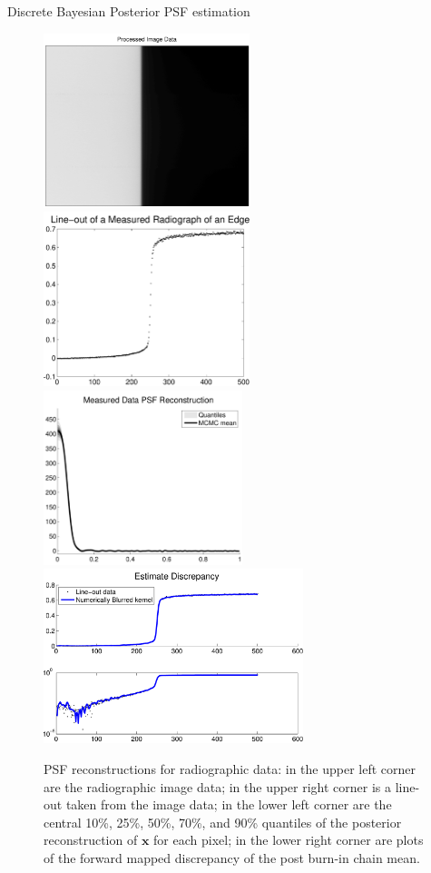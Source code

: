 \begin{chapter}{Discrete Bayesian Posterior PSF estimation}
\begin{figure}[h]
  \begin{center}
  \includegraphics[height=2in]{figures/cygnusImage.pdf}\hspace{2em}\includegraphics[height=2in]{figures/cygnusLineout.pdf}\\\vspace{2em}
  \includegraphics[height=2in]{figures/cygnusPSFrecon.pdf}\hspace{2em}\includegraphics[height=2in]{figures/discrepencyPSF.pdf}
  \caption{
  PSF reconstructions for radiographic data: in the upper left corner are the radiographic image data;
  in the upper right corner is a line-out taken from the image data;
  in the lower left corner are the central 10\%, 25\%, 50\%, 70\%, and 90\% quantiles of the posterior reconstruction of $\bm x$ for each pixel;
  in the lower right corner are plots of the forward mapped discrepancy of the post burn-in chain mean.
  } \label{fig:CygnusPsfRecon}
  \end{center}
\end{figure}


\end{chapter}
